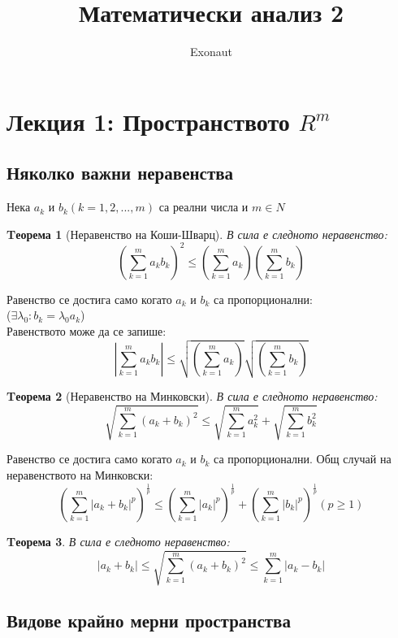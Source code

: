 \documentclass[fleqn]{article}
\title{Математически анализ 2}
\author{Exonaut}
\newtheorem{theorem}{Tеорема}[subsection]
\begin{document}
\maketitle
{}
\newpage
{}

\tableofcontents
\newpage

\section{Лекция 1: Пространството $R^m$}
\subsection{Няколко важни неравенства}
Нека $a_k $ и $b_k (k = 1, 2, ..., m) $ са реални числа и $m \in N$
\begin{theorem}[Неравенство на Коши-Шварц]
В сила е следното неравенство: \\
$$\left( \sum_{k=1}^{m}a_kb_k \right ) ^ 2   \leq  \left( \sum_{k=1}^{m}a_k \right)  \left( \sum_{k=1}^{m}b_k  \right) $$
\end{theorem}
Равенство се достига само когато $a_k$ и $b_k$ са пропорционални:\\
 ($\exists \lambda_0: b_k =\lambda_0 a_k  $)\\
Равенството може да се запише: 
$$\displaystyle\left\lvert \sum_{k=1}^{m}a_kb_k \right \rvert \leq \sqrt{\left( \sum_{k=1}^{m}a_k \right)}  \sqrt{ \left( \sum_{k=1}^{m}b_k  \right)} $$

\begin{theorem}[Неравенство на Минковски]
В сила е следното неравенство: \\
$$\sqrt{ \sum_{k=1}^{m} (a_k + b_k)^2}   \leq \sqrt{ \sum_{k=1}^{m}a_k^2 } + \sqrt{ \sum_{k=1}^{m}b_k^2 }$$
\end{theorem}
Равенство се достига само когато $a_k$ и $b_k$ са пропорционални.
Общ случай на неравенството на Минковски:
$$\left ( \sum_{k=1}^{m} |a_k + b_k|^p \right)^\frac{1}{p}   \leq\left ( \sum_{k=1}^{m}|a_k|^p\right)^\frac{1}{p} + \left ( \sum_{k=1}^{m} |b_k|^p \right)^\frac{1}{p}   ( p\geq 1)$$

\begin{theorem}
В сила е следното неравенство: \\
$$ |a_k + b_k|  \leq \sqrt{ \sum_{k=1}^{m} (a_k + b_k)^2} \leq   \sum_{k=1}^{m}|a_k - b_k| $$
\end{theorem}

\subsection{Видове крайно мерни пространства}
\end{document}
